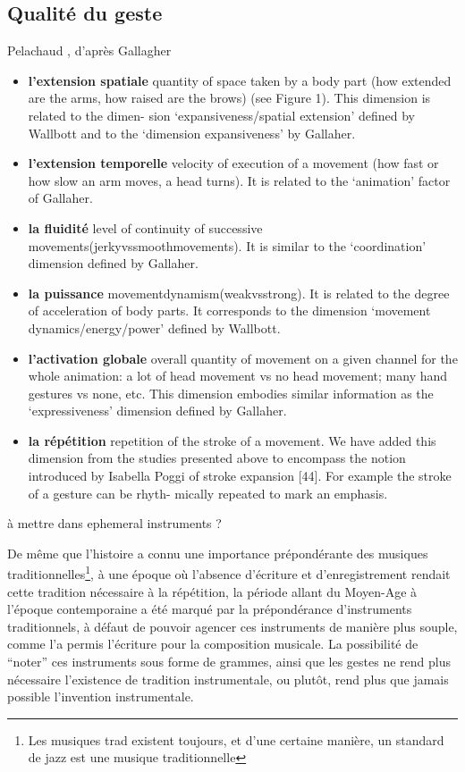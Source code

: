 \subsection{Qualité du geste}
Pelachaud \cite{pelachaud_studies_2009}, d'après Gallagher \cite{gallaher_individual_1992}
\vspace{-1em}
\begin{itemize}[noitemsep]
	\item \textbf{l'extension spatiale} quantity of space taken by a body part (how extended are the arms, how raised are the brows) (see Figure 1). This dimension is related to the dimen- sion ‘expansiveness/spatial extension’ defined by Wallbott and to the ‘dimension expansiveness’ by Gallaher.
	\item \textbf{l'extension temporelle} velocity of execution of a movement (how fast or how slow an arm moves, a head turns). It is related to the ‘animation’ factor of Gallaher.
	\item \textbf{la fluidité} level of continuity of successive movements(jerkyvssmoothmovements). It is similar to the ‘coordination’ dimension defined by Gallaher.
	\item \textbf{la puissance} movementdynamism(weakvsstrong). It is related to the degree of acceleration of body parts. It corresponds to the dimension ‘movement dynamics/energy/power’ defined by Wallbott.
	\item \textbf{l'activation globale} overall quantity of movement on a given channel for the whole animation: a lot of head movement vs no head movement; many hand gestures vs none, etc. This dimension embodies similar information as the ‘expressiveness’ dimension defined by Gallaher.
	\item \textbf{la répétition} repetition of the stroke of a movement. We have added this dimension from the studies presented above to encompass the notion introduced by Isabella Poggi of stroke expansion [44]. For example the stroke of a gesture can be rhyth- mically repeated to mark an emphasis.
\end{itemize}




à mettre dans ephemeral instruments ?

De même que l'histoire a connu une importance prépondérante des musiques traditionnelles\footnote{Les musiques trad existent toujours, et d'une certaine manière, un standard de jazz est une musique traditionnelle}, à une époque où l'absence d'écriture et d'enregistrement rendait cette tradition nécessaire à la répétition, la période allant du Moyen-Age à l'époque contemporaine a été marqué par la prépondérance d'instruments traditionnels, à défaut de pouvoir agencer ces instruments de manière plus souple, comme l'a permis l'écriture pour la composition musicale. La possibilité de ``noter'' ces instruments sous forme de grammes, ainsi que les gestes ne rend plus nécessaire l'existence de tradition instrumentale, ou plutôt, rend plus que jamais possible l'invention instrumentale.

